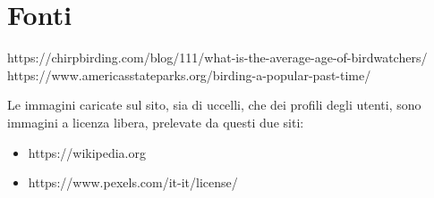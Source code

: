 \documentclass[12pt, a4paper]{article}
\begin{document}
    \section{Fonti}
    https://chirpbirding.com/blog/111/what-is-the-average-age-of-birdwatchers/
    https://www.americasstateparks.org/birding-a-popular-past-time/

    Le immagini caricate sul sito, sia di uccelli, che dei profili degli utenti, sono immagini a licenza libera, prelevate da questi due siti:
    \begin{itemize}
        \item https://wikipedia.org 
        \item https://www.pexels.com/it-it/license/    
    \end{itemize}
\end{document}
